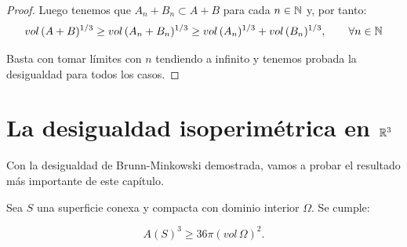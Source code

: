 \begin{proof}
Luego tenemos que $A_n + B_n \subset A + B$ para cada $n \in \mathbb{N}$ y, por tanto:
%
\begin{equation*}
    vol \, (A+B)^{1/3} \geq vol \, (A_n+B_n)^{1/3} \geq vol \, (A_n) ^{1/3} + vol \, (B_n)^{1/3}, \qquad \forall n \in \mathbb{N}
\end{equation*}

Basta con tomar límites con $n$ tendiendo a infinito y tenemos probada la desigualdad para todos los casos.
\end{proof}

\section{La desigualdad isoperimétrica en $\mathbb{R}^3$}

Con la desigualdad de Brunn-Minkowski demostrada, vamos a probar el resultado más importante de este capítulo.
\begin{theorem}
Sea $S$ una superficie conexa y compacta con dominio interior $\Omega$. Se cumple:

\begin{equation*}
    A(S)^3 \geq 36\pi(vol \, \Omega)^2.
\end{equation*}
\end{theorem}
